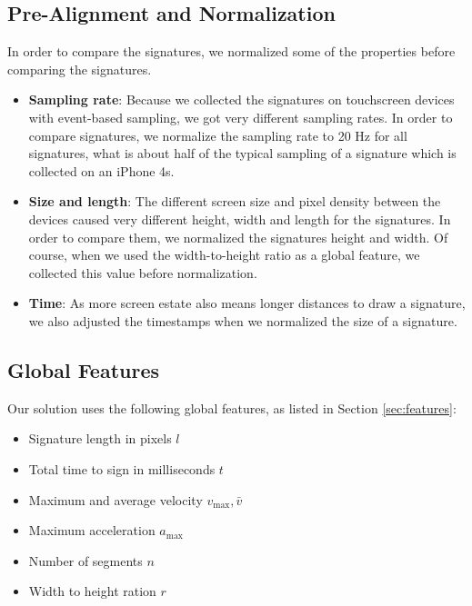 \documentclass[a4paper, oneside]{csthesis}
\begin{document}
\subsection{Pre-Alignment and Normalization}

In order to compare the signatures, we normalized some of the properties before comparing the signatures.
\begin{itemize}
\item \textbf{Sampling rate}: Because we collected the signatures on touchscreen devices with event-based sampling, we got very different sampling rates. In order to compare signatures, we normalize the sampling rate to 20 Hz for all signatures, what is about half of the typical sampling of a signature which is collected on an iPhone 4s.
\item \textbf{Size and length}: The different screen size and pixel density between the devices caused very different height, width and length for the signatures. In order to compare them, we normalized the signatures height and width. Of course, when we used the width-to-height ratio as a global feature, we collected this value before normalization.
\item \textbf{Time}: As more screen estate also means longer distances to draw a signature, we also adjusted the timestamps when we normalized the size of a signature.
\end{itemize}













\subsection{Global Features}
Our solution uses the following global features, as listed in Section \ref{sec:features}:

\begin{itemize}
\item Signature length in pixels $l$
\item Total time to sign in milliseconds $t$
\item Maximum and average velocity $v_\text{max}, \bar{v}$
\item Maximum acceleration $a_\text{max}$
\item Number of segments $n$
\item Width to height ration $r$
\end{itemize}
\end{document}
